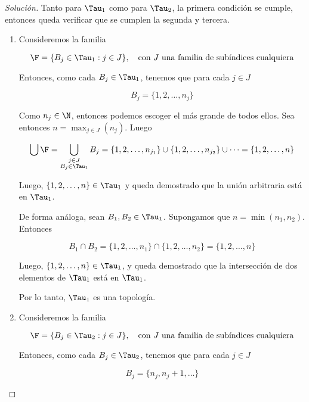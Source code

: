 \begin{proof}[Solución]

    Tanto para $\Tau_1$ como para $\Tau_2$, la primera condición se cumple, entonces queda verificar que se cumplen la segunda y tercera.
    
    \begin{enumerate}
        \item Consideremos la familia
        
        \[
        \F = \{B_j \in \Tau_1 : j \in J\}, \quad \text{con $J$ una familia de subíndices cualquiera}
        \]
        
        Entonces, como cada $B_j \in \Tau_1$, tenemos que para cada $j \in J$
        
        \[
        B_j = \{1, 2, \dots, n_j\}
        \]
        
        Como $n_j \in \N$, entonces podemos escoger el más grande de todos ellos. Sea entonces $n = \max_{j \in J} (n_j)$. Luego
        
        \[
        \bigcup \F = \bigcup_{\substack{j \in J \\ B_j \in \Tau_1}} B_j = \{1, 2, \dots, n_{j_1}\} \cup \{1, 2, \dots, n_{j_2}\} \cup \dots = \{1, 2, \dots, n\}
        \]
        
        Luego, $\{1, 2, \dots, n\} \in \Tau_1$ y queda demostrado que la unión arbitraria está en $\Tau_1$.
        
        De forma análoga, sean $B_1, B_2 \in \Tau_1$. Supongamos que $n = \min (n_1, n_2)$. Entonces
        
        \[
        B_1 \cap B_2 = \{1, 2, \dots, n_1\} \cap \{1, 2, \dots, n_2\} = \{1, 2, \dots, n\}
        \]
        
        Luego, $\{1, 2, \dots, n\} \in \Tau_1$, y queda demostrado que la intersección de dos elementos de $\Tau_1$ está en $\Tau_1$.
        
        Por lo tanto, $\Tau_1$ es una topología.
        
        \item Consideremos la familia
        
        \[
        \F = \{B_j \in \Tau_2 : j \in J\}, \quad \text{con $J$ una familia de subíndices cualquiera}
        \]
        
        Entonces, como cada $B_j \in \Tau_2$, tenemos que para cada $j \in J$
        
        \[
        B_j = \{n_{j}, n_{j}+1, \dots \}
        \]
        

\end{enumerate}
\end{proof}
